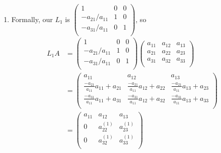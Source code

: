 \begin{enumerate}
\item
Formally, our $L_1$ is $(\begin{smallmatrix}
  1 &  0&0\\
  -a_{21}/a_{11}& 1 & 0 \\
  -a_{31}/a_{11}& 0 & 1 \\
  \end{smallmatrix})$, so 
  \begin{align*}
    L_1A &=\begin{pmatrix}
  1 &  0&0\\
  -a_{21}/a_{11}& 1 & 0 \\
  -a_{31}/a_{11}& 0 & 1 \\
  \end{pmatrix}\begin{pmatrix}
  a_{11}&  a_{12}&  a_{13}\\
  a_{21}&  a_{22}&  a_{23}\\ 
 a_{31}&  a_{32}&  a_{33}\\
\end{pmatrix}\\
&=\begin{pmatrix}
  a_{11}&  a_{12}&  a_{13}\\
\frac{-a_{21}}{a_{11}}a_{11}+a_{21}& \frac{-a_{21}}{a_{11}}a_{12}+a_{22}&   \frac{-a_{21}}{a_{11}}a_{13}+a_{23}\\ 
 \frac{-a_{31}}{a_{11}}a_{11}+a_{31}&  \frac{-a_{31}}{a_{11}}a_{12}+a_{32}&  \frac{-a_{31}}{a_{11}}a_{13}+ a_{33}\\
\end{pmatrix}\\
&=\begin{pmatrix}
  a_{11}&  a_{12}&  a_{13}\\
0& a_{22}^{(1)}&   a_{23}^{(1)}\\ 
0&  a_{32}^{(1)}&  a_{33}^{(1)}\\
\end{pmatrix}
  \end{align*}


\end{enumerate}
